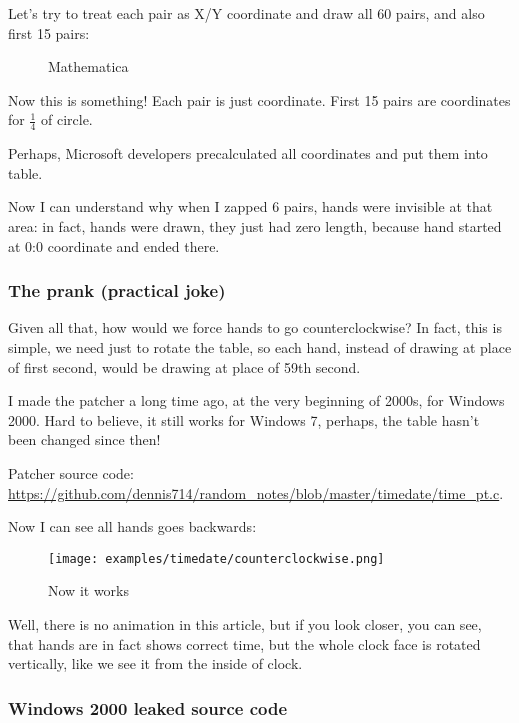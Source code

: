 Let's try to treat each pair as X/Y coordinate and draw all 60 pairs, and also first 15 pairs:

\begin{figure}[H]
\centering
{}
\caption{Mathematica}
\end{figure}

Now this is something!
Each pair is just coordinate.
First 15 pairs are coordinates for $\frac{1}{4}$ of circle.

Perhaps, Microsoft developers precalculated all coordinates and put them into table.

Now I can understand why when I zapped 6 pairs, hands were invisible at that area: in fact, hands were drawn,
they just had zero length, because hand started at 0:0 coordinate and ended there.

\subsubsection{The prank (practical joke)}

Given all that, how would we force hands to go counterclockwise?
In fact, this is simple, we need just to rotate the table, so each hand, instead of drawing at place of first second,
would be drawing at place of 59th second.

I made the patcher a long time ago, at the very beginning of 2000s, for Windows 2000.
Hard to believe, it still works for Windows 7, perhaps, the table hasn't been changed since then!

Patcher source code: \url{https://github.com/dennis714/random_notes/blob/master/timedate/time_pt.c}.

Now I can see all hands goes backwards:

\begin{figure}[H]
\centering
\texttt{[image: examples/timedate/counterclockwise.png]}
\caption{Now it works}
\end{figure}

Well, there is no animation in this article, but if you look closer, you can see, that hands are in fact shows correct
time, but the whole clock face is rotated vertically, like we see it from the inside of clock.

\subsubsection{Windows 2000 leaked source code}

